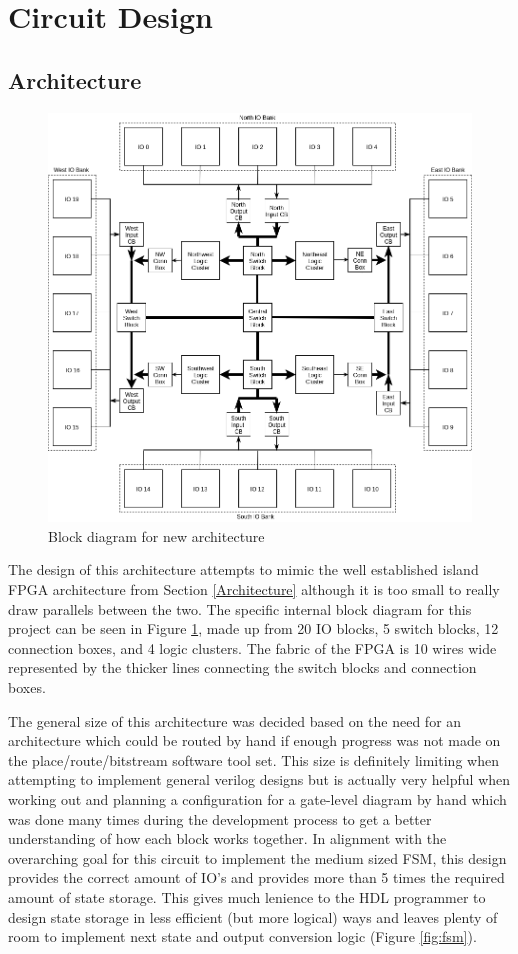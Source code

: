 \documentclass[12pt]{article}
\begin{document}
\newpage
\section{Circuit Design}

\subsection{Architecture}

\begin{figure}[htb]
  \centering
  \includegraphics[width=.9\textwidth]{internal_block}
  \caption{Block diagram for new architecture}
  \label{fig:internal_block}
\end{figure}

The design of this architecture attempts to mimic the well established island FPGA 
architecture from Section \ref{Architecture} although it is too small to really draw parallels between the two.
The specific internal block diagram for this project can be seen in Figure \ref{fig:internal_block},
made up from 20 IO blocks, 5 switch blocks, 12 connection boxes, and 4 logic clusters.
The fabric of the FPGA is 10 wires wide represented
by the thicker lines connecting the switch blocks and connection boxes.

The general size of this architecture was decided based on the need for an architecture
which could be routed by hand if enough progress was not made on the place/route/bitstream software
tool set. This size is definitely limiting when attempting to implement general
verilog designs but is actually very helpful when working out and planning a configuration
for a gate-level diagram by hand which was done many times during the development process
to get a better understanding of how each block works together. In alignment with the overarching
goal for this circuit to implement the medium sized FSM, this design provides the correct amount
of IO's and provides more than 5 times the required amount of state storage. This gives much lenience 
to the HDL programmer to design state storage in less efficient (but more logical) ways and leaves
plenty of room to implement next state and output conversion logic (Figure \ref{fig:fsm}).
\end{document}
